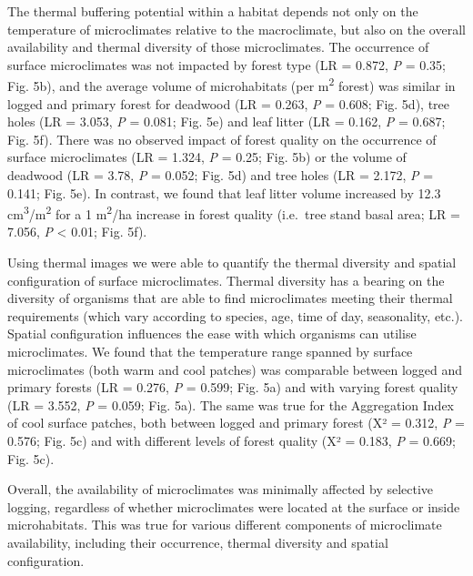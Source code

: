\documentclass[12pt,a4paper,]{report}
\theoremstyle{definition}
\theoremstyle{definition}
\theoremstyle{definition}
\theoremstyle{remark}
\begin{document}
The thermal buffering potential within a habitat depends not only on the
temperature of microclimates relative to the macroclimate, but also on
the overall availability and thermal diversity of those microclimates.
The occurrence of surface microclimates was not impacted by forest type
(LR = 0.872, \emph{P} = 0.35; Fig. 5b), and the average volume of
microhabitats (per m\textsuperscript{2} forest) was similar in logged
and primary forest for deadwood (LR = 0.263, \emph{P} = 0.608; Fig. 5d),
tree holes (LR = 3.053, \emph{P} = 0.081; Fig. 5e) and leaf litter (LR =
0.162, \emph{P} = 0.687; Fig. 5f). There was no observed impact of
forest quality on the occurrence of surface microclimates (LR = 1.324,
\emph{P} = 0.25; Fig. 5b) or the volume of deadwood (LR = 3.78, \emph{P}
= 0.052; Fig. 5d) and tree holes (LR = 2.172, \emph{P} = 0.141; Fig.
5e). In contrast, we found that leaf litter volume increased by 12.3
cm\textsuperscript{3}/m\textsuperscript{2} for a 1
m\textsuperscript{2}/ha increase in forest quality (i.e.~tree stand
basal area; LR = 7.056, \emph{P} \textless{} 0.01; Fig. 5f).

Using thermal images we were able to quantify the thermal diversity and
spatial configuration of surface microclimates. Thermal diversity has a
bearing on the diversity of organisms that are able to find
microclimates meeting their thermal requirements (which vary according
to species, age, time of day, seasonality, etc.). Spatial configuration
influences the ease with which organisms can utilise microclimates. We
found that the temperature range spanned by surface microclimates (both
warm and cool patches) was comparable between logged and primary forests
(LR = 0.276, \emph{P} = 0.599; Fig. 5a) and with varying forest quality
(LR = 3.552, \emph{P} = 0.059; Fig. 5a). The same was true for the
Aggregation Index of cool surface patches, both between logged and
primary forest (Χ² = 0.312, \emph{P} = 0.576; Fig. 5c) and with
different levels of forest quality (Χ² = 0.183, \emph{P} = 0.669; Fig.
5c).

Overall, the availability of microclimates was minimally affected by
selective logging, regardless of whether microclimates were located at
the surface or inside microhabitats. This was true for various different
components of microclimate availability, including their occurrence,
thermal diversity and spatial configuration.
\end{document}
